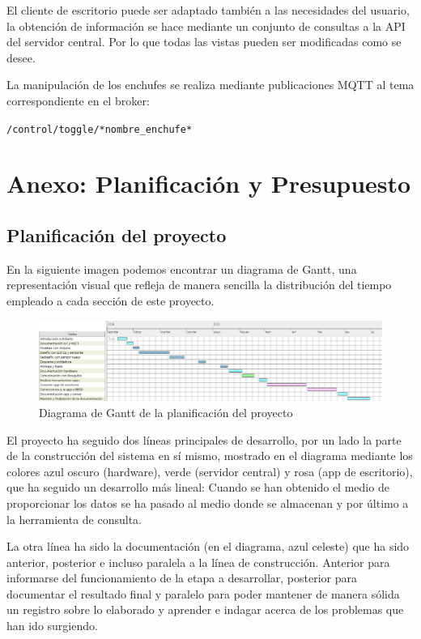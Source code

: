 \documentclass[a4paper,10pt]{article}
\begin{document}
El cliente de escritorio puede ser adaptado también a las necesidades
del usuario, la obtención de información se hace mediante un conjunto
de consultas a la API del servidor central. Por lo que todas las
vistas pueden ser modificadas como se desee.

La manipulación de los enchufes se realiza mediante publicaciones MQTT
al tema correspondiente en el broker:

\texttt{/control/toggle/*nombre\_enchufe*}

\newpage

\section{Anexo: Planificación y Presupuesto}

\subsection{Planificación del proyecto}

En la siguiente imagen podemos encontrar un diagrama de Gantt, una
representación visual que refleja de manera sencilla la distribución
del tiempo empleado a cada sección de este proyecto.

\begin{figure}[H]
  \centering
  \hspace*{-3cm}
  \includegraphics[scale=0.4]{img/plan_tfg_gantt.png}
  \caption{Diagrama de Gantt de la planificación del proyecto}\label{fig:gantt}
\end{figure}

El proyecto ha seguido dos líneas principales de desarrollo, por un
lado la parte de la construcción del sistema en sí mismo, mostrado en
el diagrama mediante los colores azul oscuro (hardware), verde
(servidor central) y rosa (app de escritorio), que ha seguido un
desarrollo más lineal: Cuando se han obtenido el medio de proporcionar
los datos se ha pasado al medio donde se almacenan y por último a la
herramienta de consulta.

La otra línea ha sido la documentación (en el diagrama, azul celeste)
que ha sido anterior, posterior e incluso paralela a la línea de
construcción. Anterior para informarse del funcionamiento de la etapa
a desarrollar, posterior para documentar el resultado final y paralelo
para poder mantener de manera sólida un registro sobre lo elaborado y
aprender e indagar acerca de los problemas que han ido surgiendo.
\end{document}
